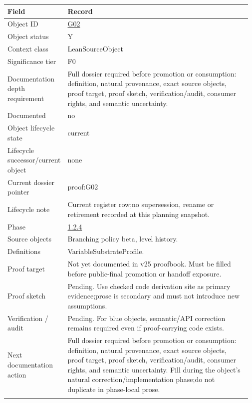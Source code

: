 \begin{longtable}{L{0.16\linewidth} L{0.81\linewidth}}
\hline
\textbf{Field} & \textbf{Record}\\
\hline
Object ID & \hyperlink{object-row-G02}{G02}\\
\hline\addlinespace[0.20em]
Object status & Y\\
\hline\addlinespace[0.20em]
Context class & LeanSourceObject\\
\hline\addlinespace[0.20em]
Significance tier & F0\\
\hline\addlinespace[0.20em]
Documentation depth requirement & Full dossier required before promotion or consumption: definition, natural provenance, exact source objects, proof target, proof sketch, verification/\allowbreak{}audit, consumer rights, and semantic uncertainty.\\
\hline\addlinespace[0.20em]
Documented & no\\
\hline\addlinespace[0.20em]
Object lifecycle state & current\\
\hline\addlinespace[0.20em]
Lifecycle successor/\allowbreak{}current object & none\\
\hline\addlinespace[0.20em]
Current dossier pointer & proof:G02\\
\hline\addlinespace[0.20em]
Lifecycle note & Current register row;\newline no supersession, rename or retirement recorded at this planning snapshot.\\
\hline\addlinespace[0.20em]
Phase & \hyperlink{phase-row-1-2-4}{1.2.4}\\
\hline\addlinespace[0.20em]
Source objects & Branching policy beta, level history.\\
\hline\addlinespace[0.20em]
Definitions & VariableSubstrateProfile.\\
\hline\addlinespace[0.20em]
Proof target & Not yet documented in v25 proofbook. Must be filled before public-final promotion or handoff exposure.\\
\hline\addlinespace[0.20em]
Proof sketch & Pending. Use checked code derivation site as primary evidence;\newline prose is secondary and must not introduce new assumptions.\\
\hline\addlinespace[0.20em]
Verification /\allowbreak{} audit & Pending. For blue objects, semantic/\allowbreak{}API correction remains required even if proof-carrying code exists.\\
\hline\addlinespace[0.20em]
Next documentation action & Full dossier required before promotion or consumption: definition, natural provenance, exact source objects, proof target, proof sketch, verification/\allowbreak{}audit, consumer rights, and semantic uncertainty. Fill during the object's natural correction/\allowbreak{}implementation phase;\newline do not duplicate in phase-local prose.\\
\hline\addlinespace[0.20em]
\end{longtable}
